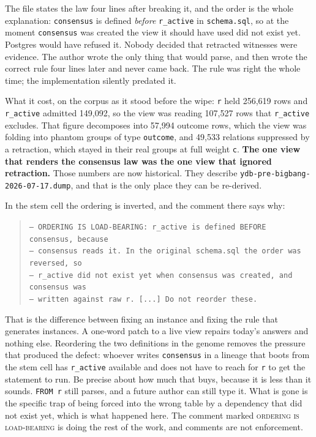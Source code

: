 The file states the law four lines after breaking it, and the order is the whole explanation: \texttt{consensus} is defined \emph{before} \texttt{r\_active} in \texttt{schema.sql}, so at the moment \texttt{consensus} was created the view it should have used did not exist yet. Postgres would have refused it. Nobody decided that retracted witnesses were evidence. The author wrote the only thing that would parse, and then wrote the correct rule four lines later and never came back. The rule was right the whole time; the implementation silently predated it.

What it cost, on the corpus as it stood before the wipe: \texttt{r} held 256{,}619 rows and \texttt{r\_active} admitted 149{,}092, so the view was reading 107{,}527 rows that \texttt{r\_active} excludes. That figure decomposes into 57{,}994 outcome rows, which the view was folding into phantom groups of type \texttt{outcome}, and 49{,}533 relations suppressed by a retraction, which stayed in their real groups at full weight \texttt{c}. \textbf{The one view that renders the consensus law was the one view that ignored retraction.} Those numbers are now historical. They describe \texttt{ydb-pre-bigbang-2026-07-17.dump}, and that is the only place they can be re-derived.

In the stem cell the ordering is inverted, and the comment there says why:

\begin{quote}
\texttt{-- ORDERING IS LOAD-BEARING: r\_active is defined BEFORE consensus, because}\\
\texttt{-- consensus reads it. In the original schema.sql the order was reversed, so}\\
\texttt{-- r\_active did not exist yet when consensus was created, and consensus was}\\
\texttt{-- written against raw r. [...] Do not reorder these.}
\end{quote}

That is the difference between fixing an instance and fixing the rule that generates instances. A one-word patch to a live view repairs today's answers and nothing else. Reordering the two definitions in the genome removes the pressure that produced the defect: whoever writes \texttt{consensus} in a lineage that boots from the stem cell has \texttt{r\_active} available and does not have to reach for \texttt{r} to get the statement to run. Be precise about how much that buys, because it is less than it sounds. \texttt{FROM r} still parses, and a future author can still type it. What is gone is the specific trap of being forced into the wrong table by a dependency that did not exist yet, which is what happened here. The comment marked \textsc{ordering is load-bearing} is doing the rest of the work, and comments are not enforcement.

